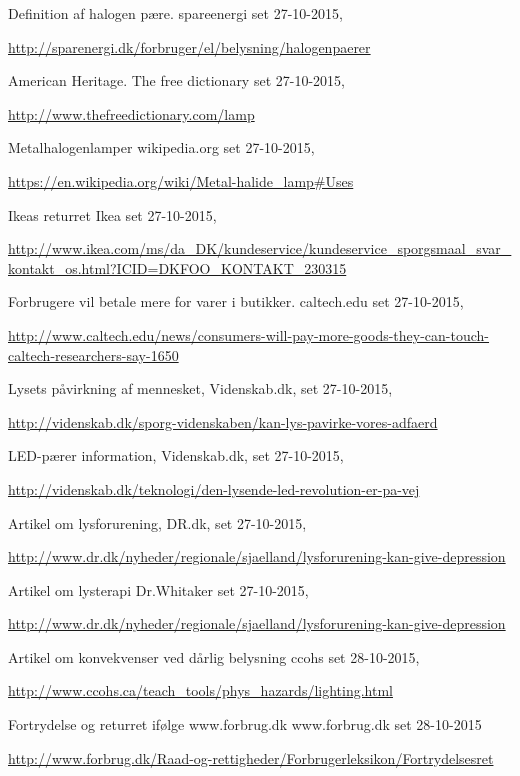   Definition af halogen pære.
  spareenergi
  set 27-10-2015,
  
  \url{http://sparenergi.dk/forbruger/el/belysning/halogenpaerer}

  American Heritage.
  The free dictionary
  set 27-10-2015,
  
  \url{http://www.thefreedictionary.com/lamp}

  Metalhalogenlamper
  wikipedia.org
  set 27-10-2015,
  
  \url{https://en.wikipedia.org/wiki/Metal-halide_lamp#Uses}

  Ikeas returret
  Ikea
  set 27-10-2015,
  
  \url{http://www.ikea.com/ms/da_DK/kundeservice/kundeservice_sporgsmaal_svar_kontakt_os.html?ICID=DKFOO_KONTAKT_230315}


  Forbrugere vil betale mere for varer i butikker.
  caltech.edu
  set 27-10-2015,
  
  \url{http://www.caltech.edu/news/consumers-will-pay-more-goods-they-can-touch-caltech-researchers-say-1650}

  Lysets påvirkning af mennesket,
  Videnskab.dk,
  set 27-10-2015,
  
  \url{http://videnskab.dk/sporg-videnskaben/kan-lys-pavirke-vores-adfaerd}

  LED-pærer information,
  Videnskab.dk,
  set 27-10-2015,
  
  \url{http://videnskab.dk/teknologi/den-lysende-led-revolution-er-pa-vej}

  Artikel om lysforurening,
  DR.dk,
  set 27-10-2015,
  
  \url{http://www.dr.dk/nyheder/regionale/sjaelland/lysforurening-kan-give-depression}

  Artikel om lysterapi
  Dr.Whitaker
  set 27-10-2015,
  
  \url{http://www.dr.dk/nyheder/regionale/sjaelland/lysforurening-kan-give-depression}

  Artikel om konvekvenser ved dårlig belysning
  ccohs
  set 28-10-2015,
  
  \url{http://www.ccohs.ca/teach_tools/phys_hazards/lighting.html}
  
  Fortrydelse og returret ifølge www.forbrug.dk
  www.forbrug.dk
  set 28-10-2015
  
  \url{http://www.forbrug.dk/Raad-og-rettigheder/Forbrugerleksikon/Fortrydelsesret}
  
  



  
